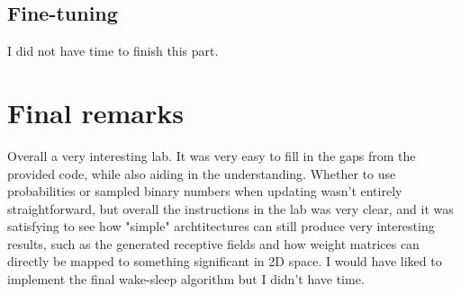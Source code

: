 \documentclass[a4paper]{article}
\begin{document}
\subsection{Fine-tuning}
I did not have time to finish this part.
\section{Final remarks}
Overall a very interesting lab. It was very easy to fill in the gaps from the provided code, while also aiding in the understanding. Whether to use probabilities or sampled binary numbers when updating wasn't entirely straightforward, but overall the instructions in the lab was very clear, and it was satisfying to see how "simple" archtitectures can still produce very interesting results, such as the generated receptive fields and how weight matrices can directly be mapped to something significant in 2D space. I would have liked to implement the final wake-sleep algorithm but I didn't have time.
\end{document}
